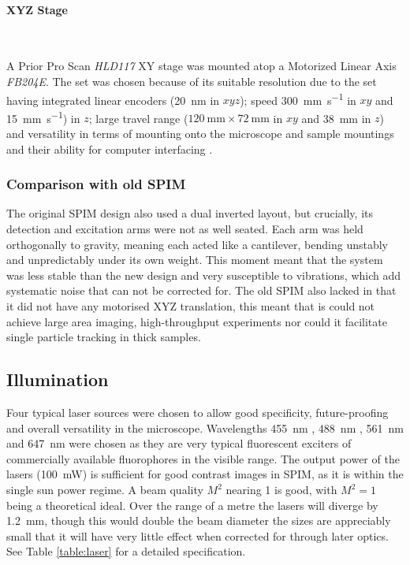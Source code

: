 \documentclass[10pt,a4paper]{report}
\begin{document}
\begin{spacing}{1.5}
\paragraph{XYZ Stage}~

A Prior Pro Scan \textit{HLD117} XY stage was mounted atop a Motorized Linear Axis \textit{FB204E}. The set was chosen because of its suitable resolution due to the set having integrated linear encoders (\SI{20}{\nano\meter} in $xyz$); speed \SI{300}{\milli\meter\per\second} in $xy$ and \SI{15}{\milli\meter\per\second}) in $z$; large travel range ($\SI{120}{\milli\meter} \times \SI{72}{\milli\meter} $ in $xy$ and \SI{38}{\milli\meter} in $z$) and versatility in terms of mounting onto the microscope and sample mountings and their ability for computer interfacing \cite{Hu2014}.

\subsubsection{Comparison with old SPIM}

The original SPIM design also used a dual inverted layout, but crucially, its detection and excitation arms were not as well seated. Each arm was held orthogonally to gravity, meaning each acted like a cantilever, bending unstably and unpredictably under its own weight. This moment meant that the system was less stable than the new design and very susceptible to vibrations, which add systematic noise that can not be corrected for. The old SPIM also lacked in that it did not have any motorised XYZ translation, this meant that is could not achieve large area imaging, high-throughput experiments nor could it facilitate single particle tracking in thick samples.

\subsection{Illumination}

Four typical laser sources were chosen to allow good specificity, future-proofing and overall versatility in the microscope. Wavelengths \textcolor{455nm}{\SI{455}{\nano\meter}} , \textcolor{488nm}{\SI{488}{\nano\meter}} , \textcolor{561nm}{\SI{561}{\nano\meter}} and \textcolor{647nm}{\SI{647}{\nano\meter}} were chosen as they are very typical fluorescent exciters of commercially available fluorophores in the visible range. The output power of the lasers (\SI{100}{\milli\watt}) is sufficient for good contrast images in SPIM, as it is within the single sun power regime. A beam quality $M^2$ nearing 1 is good, with $M^2 = 1$ being a theoretical ideal. Over the range of a metre the lasers will diverge by \SI{1.2}{\milli\meter}, though this would double the beam diameter the sizes are appreciably small that it will have very little effect when corrected for through later optics. See Table \ref{table:laser} for a detailed specification.


\end{spacing}
\end{document}

